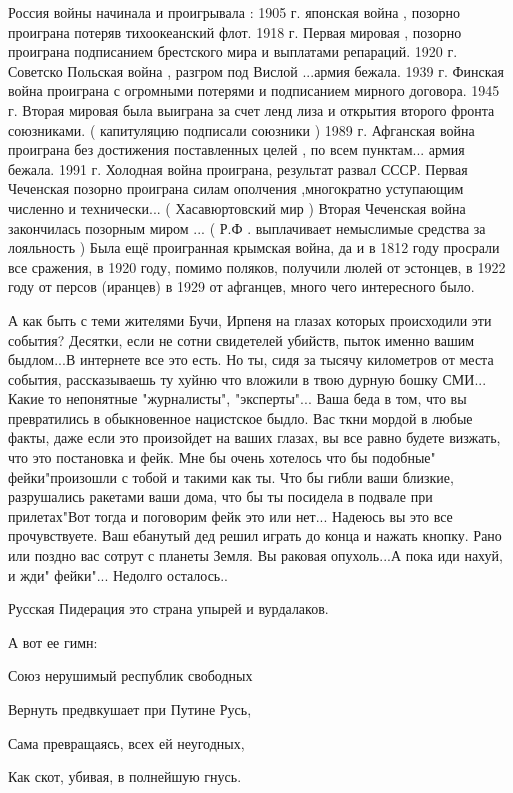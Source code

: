 Россия войны начинала и проигрывала :
1905 г. японская война , позорно проиграна потеряв тихоокеанский флот.
1918 г. Первая мировая , позорно проиграна подписанием брестского мира и выплатами репараций.
1920 г. Советско Польская война , разгром под Вислой ...армия бежала.
1939 г. Финская война проиграна с огромными потерями и подписанием мирного договора.
1945 г. Вторая мировая была выиграна за счет ленд лиза и открытия второго фронта союзниками. ( капитуляцию подписали союзники )
1989 г. Афганская война проиграна без достижения поставленных целей , по всем пунктам... армия бежала.
1991 г. Холодная война проиграна, результат развал СССР.
Первая Чеченская позорно проиграна силам ополчения ,многократно уступающим численно и технически... ( Хасавюртовский мир )
Вторая Чеченская война закончилась позорным миром ... ( Р.Ф . выплачивает немыслимые средства за лояльность )
Была ещё проигранная крымская война, да и в 1812 году просрали все сражения, в 1920 году, помимо поляков, получили люлей от эстонцев, в 1922 году от персов (иранцев) в 1929 от афганцев, много чего интересного было.

А как быть с теми жителями Бучи, Ирпеня на глазах которых происходили эти
события? Десятки, если не сотни свидетелей убийств, пыток именно вашим
быдлом...В интернете все это есть. Но ты, сидя за тысячу километров от места
события, рассказываешь ту хуйню что вложили в твою дурную бошку СМИ... Какие то
непонятные "журналисты", "эксперты"... Ваша беда в том, что вы превратились в
обыкновенное нацистское быдло. Вас ткни мордой в любые факты, даже если это
произойдет на ваших глазах, вы все равно будете визжать, что это постановка и
фейк. Мне бы очень хотелось что бы подобные" фейки"произошли с тобой и такими
как ты. Что бы гибли ваши близкие, разрушались ракетами ваши дома, что бы ты
посидела в подвале при прилетах"Вот тогда и поговорим фейк это или нет...
Надеюсь вы это все прочувствуете. Ваш ебанутый дед решил играть до конца и
нажать кнопку. Рано или поздно вас сотрут с планеты Земля. Вы раковая
опухоль...А пока иди нахуй, и жди" фейки"... Недолго осталось..

Русская Пидерация это страна упырей и вурдалаков.

А вот ее гимн:




Союз нерушимый республик свободных

Вернуть предвкушает при Путине Русь,

Сама превращаясь, всех ей неугодных,

Как скот, убивая, в полнейшую гнусь.


